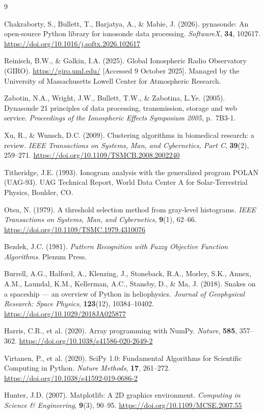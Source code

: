 \documentclass[12pt,a4paper]{article}
\begin{document}
\begin{thebibliography}{9}

Chakraborty, S., Bullett, T., Barjatya, A., \& Mabie, J. (2026).
pynasonde: An open-source Python library for ionosonde data processing.
\textit{SoftwareX}, \textbf{34}, 102617.
\url{https://doi.org/10.1016/j.softx.2026.102617}

Reinisch, B.W., \& Galkin, I.A. (2025).
Global Ionospheric Radio Observatory (GIRO).
\url{https://giro.uml.edu/} [Accessed 9 October 2025]. Managed by the
University of Massachusetts Lowell Center for Atmospheric Research.

Zabotin, N.A., Wright, J.W., Bullett, T.W., \& Zabotina, L.Ye. (2005).
Dynasonde 21 principles of data processing, transmission, storage and web
service.
\textit{Proceedings of the Ionospheric Effects Symposium 2005}, p.\ 7B3-1.

Xu, R., \& Wunsch, D.C. (2009).
Clustering algorithms in biomedical research: a review.
\textit{IEEE Transactions on Systems, Man, and Cybernetics, Part C},
\textbf{39}(2), 259--271.
\url{https://doi.org/10.1109/TSMCB.2008.2002240}

Titheridge, J.E. (1993).
Ionogram analysis with the generalized program POLAN (UAG-93).
UAG Technical Report, World Data Center A for Solar-Terrestrial Physics,
Boulder, CO.

Otsu, N. (1979).
A threshold selection method from gray-level histograms.
\textit{IEEE Transactions on Systems, Man, and Cybernetics}, \textbf{9}(1), 62--66.
\url{https://doi.org/10.1109/TSMC.1979.4310076}

Bezdek, J.C. (1981).
\textit{Pattern Recognition with Fuzzy Objective Function Algorithms}.
Plenum Press.

Burrell, A.G., Halford, A., Klenzing, J., Stoneback, R.A., Morley, S.K.,
Annex, A.M., Laundal, K.M., Kellerman, A.C., Stansby, D., \& Ma, J. (2018).
Snakes on a spaceship --- an overview of Python in heliophysics.
\textit{Journal of Geophysical Research: Space Physics}, \textbf{123}(12), 10384--10402.
\url{https://doi.org/10.1029/2018JA025877}

Harris, C.R., et al. (2020).
Array programming with NumPy.
\textit{Nature}, \textbf{585}, 357--362.
\url{https://doi.org/10.1038/s41586-020-2649-2}

Virtanen, P., et al. (2020).
SciPy 1.0: Fundamental Algorithms for Scientific Computing in Python.
\textit{Nature Methods}, \textbf{17}, 261--272.
\url{https://doi.org/10.1038/s41592-019-0686-2}

Hunter, J.D. (2007).
Matplotlib: A 2D graphics environment.
\textit{Computing in Science \& Engineering}, \textbf{9}(3), 90--95.
\url{https://doi.org/10.1109/MCSE.2007.55}

\end{thebibliography}
\end{document}
